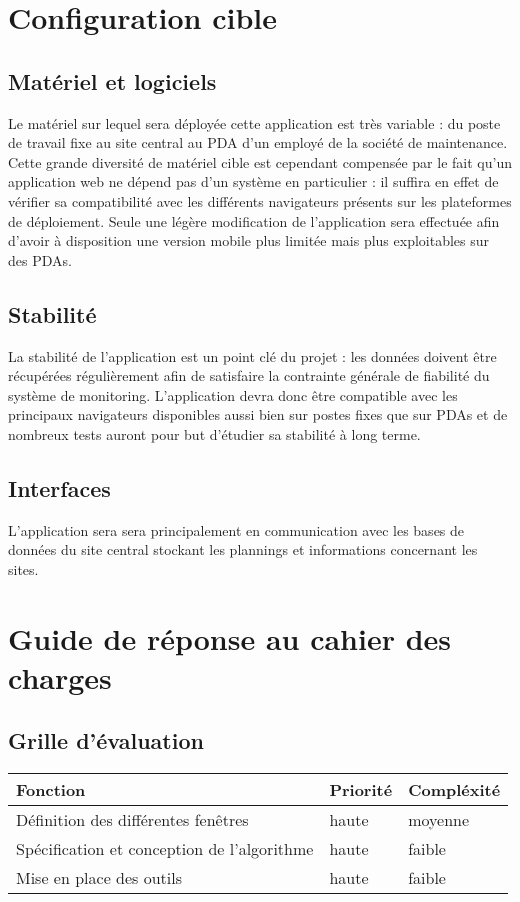 \section{Configuration cible}
\subsection{Matériel et logiciels}
Le matériel sur lequel sera déployée cette application est très variable : du poste de travail fixe au site central au PDA d'un employé de la société de maintenance. Cette grande diversité de matériel cible est cependant compensée par le fait qu'un application web ne dépend pas d'un système en particulier : il suffira en effet de vérifier sa compatibilité avec les différents navigateurs présents sur les plateformes de déploiement. Seule une légère modification de l'application sera effectuée afin d'avoir à disposition une version mobile plus limitée mais plus exploitables sur des PDAs.

\subsection{Stabilité}
La stabilité de l'application est un point clé du projet : les données doivent être récupérées régulièrement afin de satisfaire la contrainte générale de fiabilité du système de monitoring. L'application devra donc être compatible avec les principaux navigateurs disponibles aussi bien sur postes fixes que sur PDAs et de nombreux tests auront pour but d'étudier sa stabilité à long terme.

\subsection{Interfaces}
L'application sera sera principalement en communication avec les bases de données du site central stockant les plannings et informations concernant les sites.

\section{Guide de réponse au cahier des charges}
\subsection{Grille d'évaluation}
	\begin{tabular}{l l l}
	\hline
	Fonction & Priorité & Compléxité \\
	\hline
	Définition des différentes fenêtres & haute & moyenne \\
	Spécification et conception de l'algorithme & haute & faible \\
	Mise en place des outils & haute & faible \\
	
	\hline
            
        \end{tabular}
